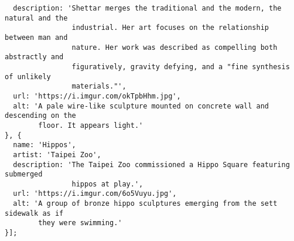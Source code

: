 \begin{verbatim}
  description: 'Shettar merges the traditional and the modern, the natural and the 
                industrial. Her art focuses on the relationship between man and 
                nature. Her work was described as compelling both abstractly and 
                figuratively, gravity defying, and a "fine synthesis of unlikely 
                materials."',
  url: 'https://i.imgur.com/okTpbHhm.jpg',
  alt: 'A pale wire-like sculpture mounted on concrete wall and descending on the 
        floor. It appears light.'
}, {
  name: 'Hippos',
  artist: 'Taipei Zoo',
  description: 'The Taipei Zoo commissioned a Hippo Square featuring submerged 
                hippos at play.',
  url: 'https://i.imgur.com/6o5Vuyu.jpg',
  alt: 'A group of bronze hippo sculptures emerging from the sett sidewalk as if 
        they were swimming.'
}];

    \end{verbatim} 